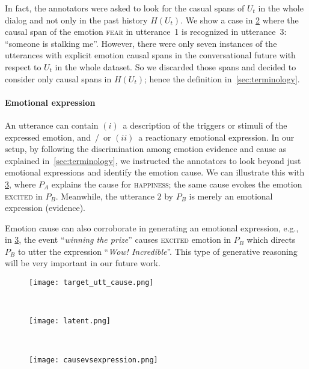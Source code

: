 \documentclass[smallextended]{svjour3}
\newcommand\emo[1]{\textsc{#1}}
\newcommand\ToDeleteIfNeedSpace{}
\newcommand\0{\hphantom{0}}
\begin{document}
In fact, the annotators were asked to look for the casual spans of $U_t$ in the whole dialog and not only in the past history $H(U_t)$. We show 
a
case in \cref{fig:latent_cause} where the causal span of the emotion \emo{fear} in utterance~1 is recognized in utterance~3: ``someone is stalking me''.
However, 
there were
only seven instances of the utterances with explicit emotion causal spans 
in the conversational future with respect to $U_t$ in the whole dataset.
So
we discarded those spans and decided to consider only causal spans in $H(U_t)$; hence the definition in~\cref{sec:terminology}.

\paragraph{Emotional expression}
An utterance can contain \textit{$(i)$}~a description of the triggers or stimuli of the expressed emotion, and~/~or \textit{$(ii)$}~a reactionary emotional expression. 
In our setup, by following the discrimination among emotion evidence and cause as explained in~\cref{sec:terminology}, we instructed the annotators to look beyond just emotional expressions and 
identify the 
emotion cause. We can illustrate this with
\cref{fig:causevsexpression}, where $P_A$ explains the cause for \emo{happiness}; the same cause evokes the emotion \emo{excited} in $P_B$. Meanwhile, the utterance $2$ by $P_B$ is merely an emotional expression (evidence).


\ToDeleteIfNeedSpace Emotion cause can also corroborate in generating an emotional expression, e.g., in \cref{fig:causevsexpression}, the event ``\textit{winning the prize}'' causes \emo{excited} emotion in $P_B$ which directs $P_B$ to utter the expression ``\textit{Wow! Incredible}''. This type of generative reasoning will be very important in our future work.

\begin{figure*}[t]
     \centering
     \begin{subfigure}[b]{60ex}
         \centering
         \texttt{[image: target\_utt\_cause.png]}
         \caption{}
         \label{fig:emotion_in_target}
     \end{subfigure}
\\[3ex]
     \begin{subfigure}[b]{60ex}
         \centering
         \texttt{[image: latent.png]}
         \caption{}
         \label{fig:latent_cause}
     \end{subfigure}
\\[3ex]
     \begin{subfigure}[b]{60ex}
         \centering
         \texttt{[image: causevsexpression.png]}
         \caption{}
         \label{fig:causevsexpression}
     \end{subfigure}
     \caption{{($a$) No context. {($b$)} Unmentioned latent cause. {($c$}) Distinguishing emotion cause from emotional expressions}.}
\end{figure*}
\end{document}
